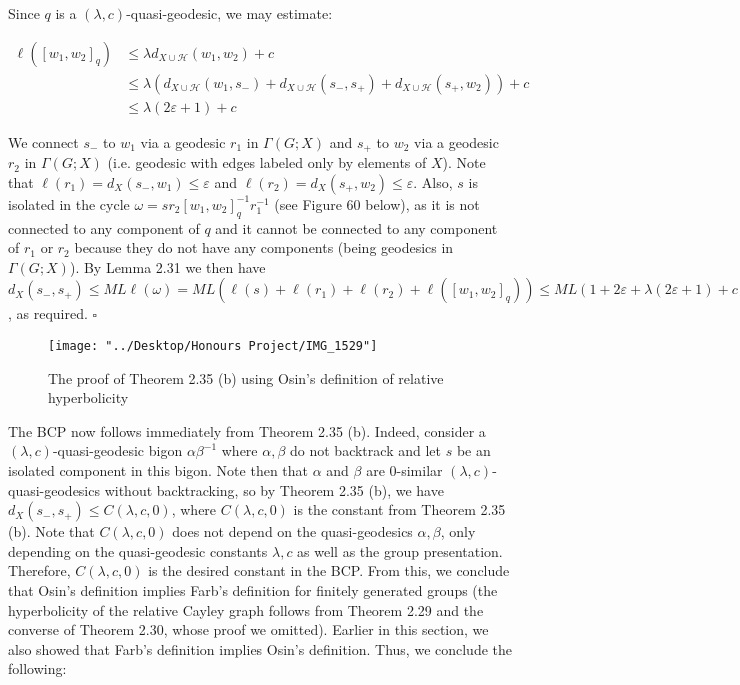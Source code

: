 \documentclass[12pt]{article}
\begin{document}
	Since $q$ is a $(\lambda, c)$-quasi-geodesic, we may estimate: 
	
	\begin{align*}
	\ell([w_1, w_2]_{q}) &\leq \lambda d_{X \cup \mathcal{H}}(w_1, w_2) + c \\
	&\leq \lambda (d_{X \cup \mathcal{H}}(w_1, s_-) + d_{X \cup \mathcal{H}}(s_-, s_+) + d_{X \cup \mathcal{H}}(s_+, w_2)) + c \\
	&\leq \lambda(2 \varepsilon + 1) + c
	\end{align*}
	
	We connect $s_-$ to $w_1$ via a geodesic $r_1$ in $\Gamma(G;X)$ and $s_+$ to $w_2$ via a geodesic $r_2$ in $\Gamma(G;X)$ (i.e. geodesic with edges labeled only by elements of $X$). Note that $\ell(r_1) = d_X(s_-, w_1) \leq \varepsilon$ and $\ell(r_2) = d_X(s_+, w_2) \leq \varepsilon$. Also, $s$ is isolated in the cycle $\omega = sr_2 [w_1, w_2]_q^{-1} r_1^{-1}$ (see Figure 60 below), as it is not connected to any component of $q$ and it cannot be connected to any component of $r_1$ or $r_2$ because they do not have any components (being geodesics in $\Gamma(G;X)$). By Lemma 2.31 we then have $d_X(s_-, s_+) \leq ML \ell(\omega) = ML (\ell(s) + \ell(r_1) + \ell(r_2) + \ell([w_1, w_2]_q)) \leq ML(1 + 2 \varepsilon + \lambda(2 \varepsilon + 1) + c) = C$, as required.  $\square$
	
	
\begin{figure} [H]
	\centering
	\texttt{[image: "../Desktop/Honours Project/IMG\_1529"]}
	\caption{The proof of Theorem 2.35 (b) using Osin's definition of relative hyperbolicity}
	\label{fig:img1529}
\end{figure}
	
	The BCP now follows immediately from Theorem 2.35 (b). Indeed, consider a $(\lambda, c)$-quasi-geodesic bigon $\alpha \beta^{-1}$ where $\alpha, \beta$ do not backtrack and let $s$ be an isolated component in this bigon. Note then that $\alpha$ and $\beta$ are 0-similar $(\lambda, c)$-quasi-geodesics without backtracking, so by Theorem 2.35 (b), we have $d_X(s_-, s_+) \leq C(\lambda, c, 0)$, where $C(\lambda, c, 0)$ is the constant from Theorem 2.35 (b). Note that $C(\lambda, c, 0)$ does not depend on the quasi-geodesics $\alpha, \beta$, only depending on the quasi-geodesic constants $\lambda, c$ as well as the group presentation. Therefore, $C(\lambda, c, 0)$ is the desired constant in the BCP. From this, we conclude that Osin's definition implies Farb's definition for finitely generated groups (the hyperbolicity of the relative Cayley graph follows from Theorem 2.29 and the converse of Theorem 2.30, whose proof we omitted). Earlier in this section, we also showed that Farb's definition implies Osin's definition. Thus, we conclude the following: 
	
\end{document}
